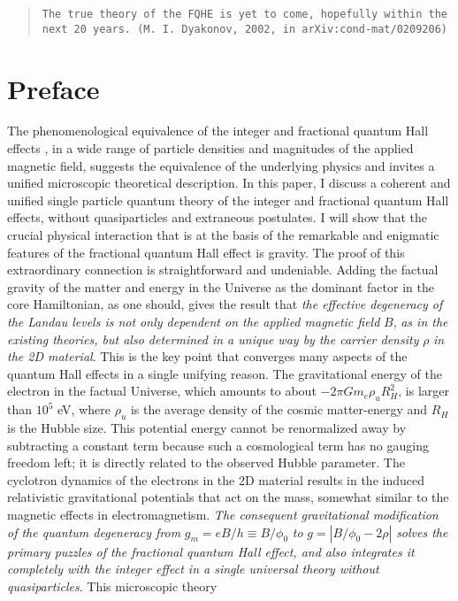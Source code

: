 \documentclass[aps,preprint,12pt,tightenlines]{revtex4}%
\begin{document}
\begin{quote}
\newpage

\texttt{The true theory of the FQHE is yet to come, hopefully within the next
20 years. (M. I. Dyakonov, 2002, in arXiv:cond-mat/0209206)}
\end{quote}

\section{Preface}

The phenomenological equivalence of the integer and fractional quantum Hall effects \cite{QHE-book}, in a wide range of particle densities and magnitudes of the applied magnetic field, suggests the equivalence of the underlying physics and invites a unified microscopic theoretical description. In this paper, I discuss a coherent and unified single particle quantum theory
of the integer and fractional quantum Hall effects, without quasiparticles and
extraneous postulates. I will show that the crucial physical interaction that
is at the basis of the remarkable and enigmatic features of the fractional
quantum Hall effect is gravity. The proof of this extraordinary connection is
straightforward and undeniable. Adding the factual gravity of the matter and
energy in the Universe as the dominant factor in the core Hamiltonian, as one
should, gives the result that \emph{the effective degeneracy of the Landau
levels is not only dependent on the applied magnetic field }$B$, \emph{as in
the existing theories, but also determined in a unique way by the carrier
density} $\rho$ \emph{in the 2D material}. This is the key point that
converges many aspects of the quantum Hall effects in a single unifying
reason. The gravitational energy of the electron in the factual Universe,
which amounts to about $-2\pi Gm_{e}\rho_{u}R_{H}^{2}$, is larger than
$10^{5}$ eV, where $\rho_{u}$ is the average density of the cosmic
matter-energy and $R_{H}$ is the Hubble size. This potential energy cannot be
renormalized away by subtracting a constant term because such a cosmological
term has no gauging freedom left; it is directly related to the observed
Hubble parameter. The cyclotron dynamics of the electrons in the 2D material
results in the induced relativistic gravitational potentials that act on the
mass, somewhat similar to the magnetic effects in electromagnetism. \emph{The
consequent gravitational modification of the quantum degeneracy from }%
$g_{m}=eB/h\equiv B/\phi_{0}$\emph{ to }$g=\left\vert B/\phi_{0}%
-2\rho\right\vert $\emph{ solves the primary puzzles of the fractional quantum
Hall effect, and also integrates it completely with the integer effect in a
single universal theory without quasiparticles}. This microscopic theory
\end{document}
